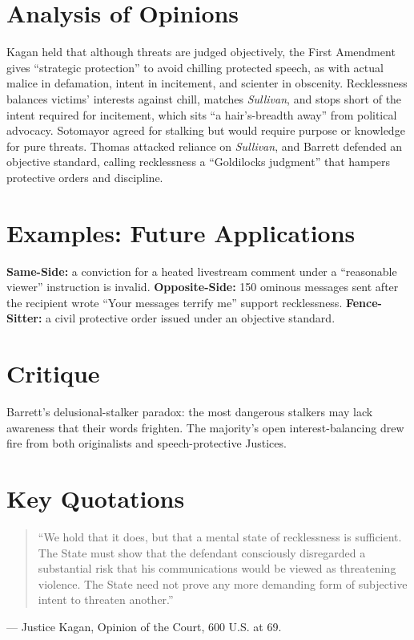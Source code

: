 \documentclass[12pt]{article}
\begin{document}
\section{Analysis of Opinions}
Kagan held that although threats are judged objectively, the First Amendment gives ``strategic protection'' to avoid chilling protected speech, as with actual malice in defamation, intent in incitement, and scienter in obscenity. Recklessness balances victims' interests against chill, matches \textit{Sullivan}, and stops short of the intent required for incitement, which sits ``a hair's-breadth away'' from political advocacy. Sotomayor agreed for stalking but would require purpose or knowledge for pure threats. Thomas attacked reliance on \textit{Sullivan}, and Barrett defended an objective standard, calling recklessness a ``Goldilocks judgment'' that hampers protective orders and discipline.

\section{Examples: Future Applications}
\textbf{Same-Side:} a conviction for a heated livestream comment under a ``reasonable viewer'' instruction is invalid. \textbf{Opposite-Side:} 150 ominous messages sent after the recipient wrote ``Your messages terrify me'' support recklessness. \textbf{Fence-Sitter:} a civil protective order issued under an objective standard.

\section{Critique}
Barrett's delusional-stalker paradox: the most dangerous stalkers may lack awareness that their words frighten. The majority's open interest-balancing drew fire from both originalists and speech-protective Justices.

\section{Key Quotations}
\begin{quote}
``We hold that it does, but that a mental state of recklessness is sufficient. The State must show that the defendant consciously disregarded a substantial risk that his communications would be viewed as threatening violence. The State need not prove any more demanding form of subjective intent to threaten another.''
\end{quote}
\noindent --- Justice Kagan, Opinion of the Court, 600 U.S. at 69.
\end{document}

